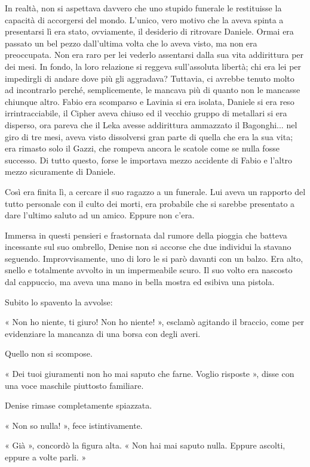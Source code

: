 In realtà, non si aspettava davvero che uno stupido funerale le restituisse la capacità di accorgersi del mondo. L'unico, vero motivo che la aveva spinta a presentarsi lì era stato, ovviamente, il desiderio di ritrovare Daniele. Ormai era passato un bel pezzo dall'ultima volta che lo aveva visto, ma non era preoccupata. Non era raro per lei vederlo assentarsi dalla sua vita addirittura per dei mesi. In fondo, la loro relazione si reggeva sull'assoluta libertà; chi era lei per impedirgli di andare dove più gli aggradava? Tuttavia, ci avrebbe tenuto molto ad incontrarlo perché, semplicemente, le mancava più di quanto non le mancasse chiunque altro. Fabio era scomparso e Lavinia si era isolata, Daniele si era reso irrintracciabile, il Cipher aveva chiuso ed il vecchio gruppo di metallari si era disperso, ora pareva che il Leka avesse addirittura ammazzato il Bagonghi... nel giro di tre mesi, aveva visto dissolversi gran parte di quella che era la sua vita; era rimasto solo il Gazzi, che rompeva ancora le scatole come se nulla fosse successo. Di tutto questo, forse le importava mezzo accidente di Fabio e l'altro mezzo sicuramente di Daniele. 

Così era finita lì, a cercare il suo ragazzo a un funerale. Lui aveva un rapporto del tutto personale con il culto dei morti, era probabile che si sarebbe presentato a dare l'ultimo saluto ad un amico. Eppure non c'era.

Immersa in questi pensieri e frastornata dal rumore della pioggia che batteva incessante sul suo ombrello, Denise non si accorse che due individui la stavano seguendo. Improvvisamente, uno di loro le si parò davanti con un balzo. Era alto, snello e totalmente avvolto in un impermeabile scuro. Il suo volto era nascosto dal cappuccio, ma aveva una mano in bella mostra ed esibiva una pistola.

Subito lo spavento la avvolse:

« Non ho niente, ti giuro! Non ho niente! », esclamò agitando il braccio, come per evidenziare la mancanza di una borsa con degli averi.

Quello non si scompose.

« Dei tuoi giuramenti non ho mai saputo che farne. Voglio risposte », disse con una voce maschile piuttosto familiare.

Denise rimase completamente spiazzata.

« Non so nulla! », fece istintivamente.

« Già », concordò la figura alta. « Non hai mai saputo nulla. Eppure ascolti, eppure a volte parli. »

